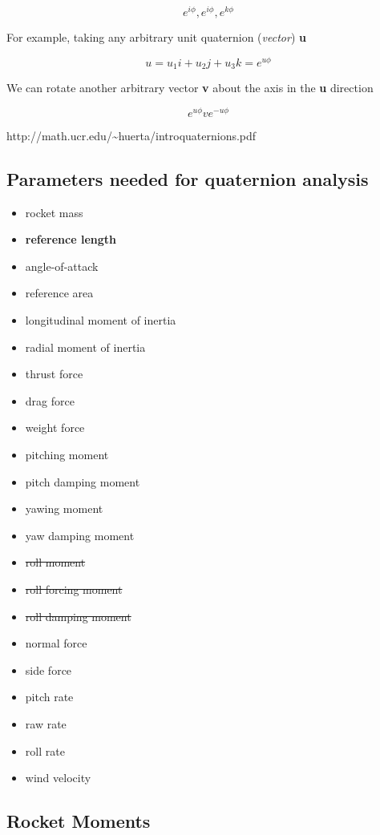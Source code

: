 \documentclass[]{book}
\providecommand{\tightlist}{%
  \setlength{\itemsep}{0pt}\setlength{\parskip}{0pt}}
\begin{document}
\[
e^{i\phi}, e^{i\phi}, e^{k\phi}
\]

For example, taking any arbitrary unit quaternion (\emph{vector})
\textbf{u}

\[
u = u_1i + u_2j + u_3k = e^{u\phi}
\]

We can rotate another arbitrary vector \textbf{v} about the axis in the
\textbf{u} direction

\[
e^{u\phi}ve^{-u\phi}
\]

http://math.ucr.edu/\textasciitilde{}huerta/introquaternions.pdf

\subsection{Parameters needed for quaternion
analysis}\label{parameters-needed-for-quaternion-analysis}

\begin{itemize}
\tightlist
\item
  rocket mass
\item
  \textbf{reference length}
\item
  angle-of-attack
\item
  reference area
\item
  longitudinal moment of inertia
\item
  radial moment of inertia
\item
  thrust force
\item
  drag force
\item
  weight force
\item
  pitching moment
\item
  pitch damping moment
\item
  yawing moment
\item
  yaw damping moment
\item
  \sout{roll moment}
\item
  \sout{roll forcing moment}
\item
  \sout{roll damping moment}
\item
  normal force
\item
  side force
\item
  pitch rate
\item
  raw rate
\item
  roll rate
\item
  wind velocity
\end{itemize}

\subsection{Rocket Moments}\label{rocket-moments}
\end{document}
